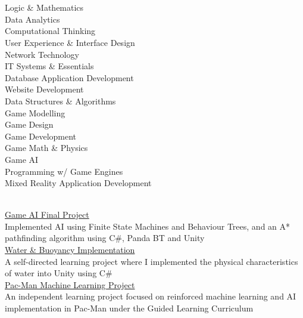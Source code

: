 \documentclass[a4paper,10pt]{article}
\begin{document}
  \begin{paracol}{2}
    \begin{leftcolumn}
      \Large\noindent{}
      \vspace{0.15cm}\\
      \normalsize{}\\
      \small\lato
      Logic \& Mathematics\\
      Data Analytics\\
      Computational Thinking\\
      User Experience \& Interface Design\\
      Network Technology\\
      IT Systems \& Essentials\\
      Database Application Development\\
      Website Development\\
      Data Structures \& Algorithms\\
      Game Modelling\\
      Game Design\\
      Game Development\\
      Game Math \& Physics\\
      Game AI\\
      Programming w/ Game Engines\\
      Mixed Reality Application Development

      \vspace{0.35cm}

      \Large\noindent{}
      \vspace{0.15cm}\\
      \small\latobold\latobold\href{https://youtu.be/Mmlq38I_PQ8}{Game AI Final Project}\\
      \small\lato Implemented AI using Finite State Machines and Behaviour Trees, and an A* pathfinding algorithm using C\#, Panda BT and Unity\\
      \small\latobold\latobold\href{https://youtu.be/LhJZbvc6WNk}{Water \& Buoyancy Implementation}\\
      \small\lato A self-directed learning project where I implemented the physical characteristics of water into Unity using C\#\\
      \small\latobold\href{https://1907077j.wixsite.com/portfolio}{Pac-Man Machine Learning Project}\\
      \small\lato An independent learning project focused on reinforced machine learning and AI implementation in Pac-Man under the Guided Learning Curriculum
      \vspace{0.35cm}


\end{leftcolumn}
\end{paracol}
\end{document}

